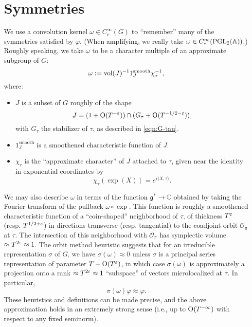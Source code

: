\documentclass[reqno]{amsart} 
\numberwithin{equation}{section}
\begin{document}
\section{Symmetries}\label{sec:org1580512}
We use a convolution kernel $\omega \in C_c^\infty(G)$ to ``remember'' many of the symmetries satisfied by $\varphi$.  (When amplifying, we really take $\omega \in C_c^\infty(\operatorname{PGL}_2(\mathbb{A}))$.)  Roughly speaking, we take $\omega$ to be a character multiple of an approximate subgroup of $G$:
\begin{equation*}
  \omega := \operatorname{vol}(J)^{-1} 1_J^{\text{smooth}} \chi_\tau^{-1},
\end{equation*}
where:
\begin{itemize}
\item $J$ is a subset of $G$ roughly of the shape
  \begin{equation*}
    J = (1 + \operatorname{O}(T^{-\varepsilon})) \cap (G_\tau + \operatorname{O}(T^{-1/2-\varepsilon})),
  \end{equation*}
  with $G_\tau$ the stabilizer of $\tau$, as described in \eqref{eqn:G-tau}.
\item $1_J^{\text{smooth}}$ is a smoothened characteristic function of $J$.
\item $\chi_\tau$ is the ``approximate character'' of $J$ attached to $\tau$, given near the identity in exponential coordinates by
  \begin{equation*}
    \chi_\tau(\exp(X)) = e^{i \langle X, \tau \rangle}.
  \end{equation*}  
\end{itemize}

We may also describe $\omega$ in terms of the function $\mathfrak{g}^* \rightarrow \mathbb{C}$ obtained by taking the Fourier transform of the pullback $\omega \circ \exp$.  This function is roughly a smoothened characteristic function of a ``coin-shaped'' neighborhood of $\tau$, of thickness $T^\varepsilon$ (resp. $T^{1/2+\varepsilon}$) in directions transverse (resp. tangential) to the coadjoint orbit $\mathcal{O}_\pi$ at $\tau$.  The intersection of this neighborhood with $\mathcal{O}_\pi$ has symplectic volume $\approx T^{2 \varepsilon} \approx 1$.  The orbit method heuristic suggests that for an irreducible representation $\sigma$ of $G$, we have $\sigma(\omega) \approx 0$ unless $\sigma$ is a principal series representation of parameter $T + \operatorname{O}(T^{\varepsilon})$, in which case $\sigma(\omega)$ is approximately a projection onto a rank $\approx T^{2 \varepsilon} \approx 1$ ``subspace'' of vectors microlocalized at $\tau$.  In particular,
\begin{equation}\label{eqn:35ac3e34eb}
  \pi(\omega) \varphi \approx \varphi.
\end{equation}
These heuristics and definitions can be made precise, and the above approximation holds in an extremely strong sense (i.e., up to $\operatorname{O}(T^{-\infty})$ with respect to any fixed seminorm).
\end{document}
